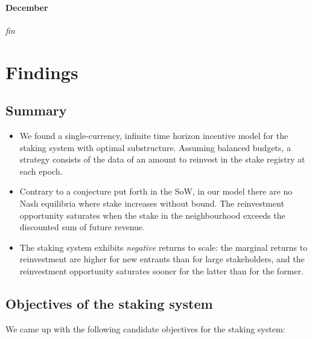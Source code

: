 \paragraph{December} \emph{fin}

\newpage
\section*{Findings}


\subsection*{Summary}

\begin{itemize}
  \item We found a single-currency, infinite time horizon incentive model for the staking system with optimal substructure.
  Assuming balanced budgets, a strategy consists of the data of an amount to reinvest in the stake registry at each epoch.

  \item Contrary to a conjecture put forth in the SoW, in our model there are no Nash equilibria where stake increases without bound.
  The reinvestment opportunity saturates when the stake in the neighbourhood exceeds the discounted sum of future revenue.
  \item The staking system exhibits \emph{negative} returns to scale: the marginal returns to reinvestment are higher for new entrants than for large stakeholders, and the reinvestment opportunity saturates sooner for the latter than for the former.
\end{itemize}

\subsection*{Objectives of the staking system}

We came up with the following candidate objectives for the staking system:

